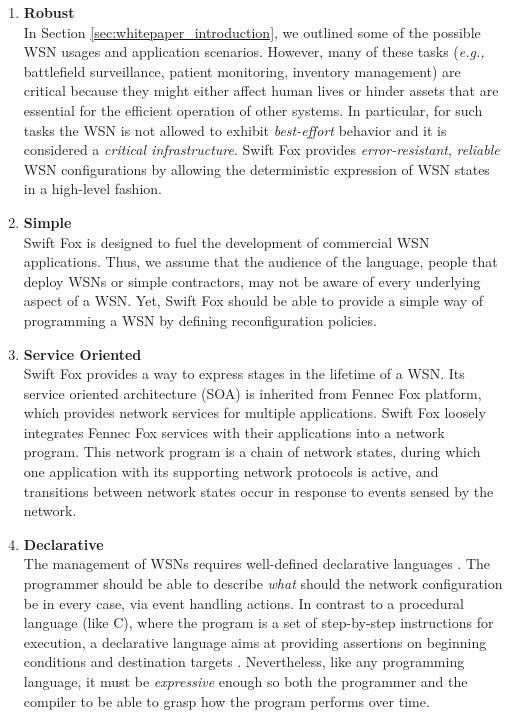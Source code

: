 \begin{enumerate}
	\item \textbf{Robust}			\\
	In Section \ref{sec:whitepaper_introduction}, we outlined some of the
	possible WSN usages and application scenarios. However, many
	of these tasks (\textit{e.g.,} battlefield surveillance, patient
	monitoring, inventory management) are critical because they might 
	either affect human lives or hinder assets that are essential for
	the efficient operation of other systems. In particular, for
	such tasks the WSN is not allowed to exhibit \textit{best-effort}
	behavior and it is considered a \textit{critical infrastructure}.
	Swift Fox provides \textit{error-resistant}, \textit{reliable}
	WSN configurations by allowing the deterministic expression of WSN
	states in a high-level fashion.	
	
	\item \textbf{Simple}			\\
	Swift Fox is designed to fuel the development of commercial WSN
	applications. Thus, we assume that the audience of the language,
	people that deploy WSNs or simple contractors, may not be aware of
	every underlying aspect of a WSN. Yet, Swift Fox should be able to
	provide a simple way of programming a WSN by defining
	reconfiguration policies.

        \item \textbf{Service Oriented}       \\
	Swift Fox provides a way to express stages in the lifetime of
	a WSN. Its service oriented architecture (SOA) is inherited
	from Fennec Fox platform, which provides network services for
	multiple applications. Swift Fox loosely integrates Fennec Fox
	services with their applications into a network program. This
	network program is a chain of network states, during which one
	application with its supporting network protocols is active, and
	transitions between network states occur in response to events
	sensed by the network.   

	\item \textbf{Declarative}		\\
	The management of WSNs requires well-defined declarative languages
	\cite{hug90}. The programmer should be able to describe
	\textit{what} should the network configuration be in every case,
	via event handling actions. In contrast to a procedural language 
	(like C), where the program is a set of step-by-step instructions
	for execution, a declarative language aims at providing assertions 
	on beginning conditions and destination targets
	\cite{jinghuang:online}. Nevertheless, like any programming
	language, it must be \textit{expressive} enough so both the
	programmer and the compiler to be able to grasp how the program
	performs over time.


\end{enumerate}
